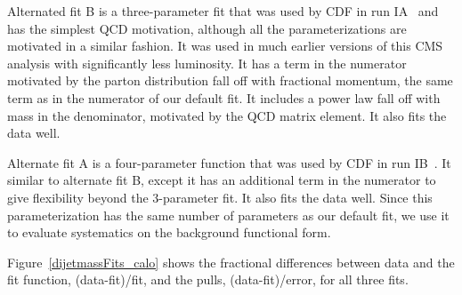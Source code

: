 Alternated fit B is a three-parameter fit that was used by CDF in run
IA~\cite{Abe:1995jz} and has the simplest QCD motivation, although
all the parameterizations are motivated in a similar fashion.  It was
used in much earlier versions of this CMS analysis with significantly
less luminosity.  It has a term in the numerator motivated by the
parton distribution fall off with fractional momentum, the same term
as in the numerator of our default fit.  It includes a power law fall
off with mass in the denominator, motivated by the QCD matrix
element. It also fits the data well.

Alternate fit A is a four-parameter function that was used by CDF in
run IB~\cite{Abe:1997hm}.
It similar to alternate fit B, except it has an additional term in the
numerator to give flexibility beyond the 3-parameter fit.
It also fits the data well.
Since this parameterization has the same number of
parameters as our default fit, we use it to evaluate systematics on
the background functional form. 

Figure~\ref{dijetmassFits_calo} shows the fractional 
differences between data and the fit function, (data-fit)/fit, 
and the pulls, (data-fit)/error, for all three fits.

